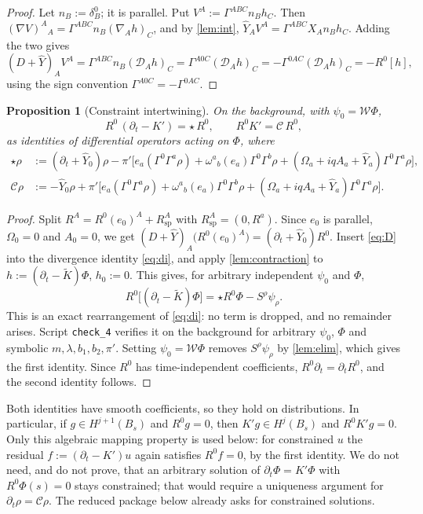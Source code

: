 \documentclass[11pt]{article}
\theoremstyle{plain}
\newtheorem{proposition}[theorem]{Proposition}
\theoremstyle{definition}
\theoremstyle{remark}
\newcommand{\Dcal}{\mathcal{D}}
\newcommand{\Wcal}{\mathcal{W}}
\newcommand{\Ccal}{\mathcal{C}}
\begin{document}
\begin{proof}
Let $n_B := \delta^0_B$; it is parallel. Put $V^A := \Gamma^{ABC}n_Bh_C$. Then $(\nabla V)^{A}{}_{A} = \Gamma^{ABC}n_B(\nabla_Ah)_C$, and by \cref{lem:int}, $\hat Y_AV^A = \Gamma^{ABC}X_An_Bh_C$. Adding the two gives
\[
  (D+\hat Y)_AV^A = \Gamma^{ABC}n_B(\Dcal_Ah)_C = \Gamma^{A0C}(\Dcal_Ah)_C = -\Gamma^{0AC}(\Dcal_Ah)_C = -R^0[h],
\]
using the sign convention $\Gamma^{A0C} = -\Gamma^{0AC}$.
\end{proof}

\begin{proposition}[Constraint intertwining]\label{prop:ci}
On the background, with $\psi_0 = \Wcal\Phi$,
\[
  R^0\,(\partial_t - K') = \star\, R^0,\qquad R^0K' = \Ccal\, R^0,
\]
as identities of differential operators acting on $\Phi$, where
\begin{align*}
  \star\rho &:= (\partial_t + \hat Y_0)\rho - \pi'\bigl[e_a(\Gamma^0\Gamma^a\rho) + \omega^{a}{}_{b}(e_a)\Gamma^0\Gamma^b\rho + (\Omega_a + iqA_a + \hat Y_a)\Gamma^0\Gamma^a\rho\bigr],\\
  \Ccal\rho &:= -\hat Y_0\rho + \pi'\bigl[e_a(\Gamma^0\Gamma^a\rho) + \omega^{a}{}_{b}(e_a)\Gamma^0\Gamma^b\rho + (\Omega_a + iqA_a + \hat Y_a)\Gamma^0\Gamma^a\rho\bigr].
\end{align*}
\end{proposition}

\begin{proof}
Split $R^A = R^0(e_0)^A + R^A_{\mathrm{sp}}$ with $R^A_{\mathrm{sp}} = (0,R^a)$. Since $e_0$ is parallel, $\Omega_0 = 0$ and $A_0 = 0$, we get $(D+\hat Y)_A\bigl(R^0(e_0)^A\bigr) = (\partial_t + \hat Y_0)R^0$. Insert \eqref{eq:D} into the divergence identity \eqref{eq:di}, and apply \cref{lem:contraction} to $h := (\partial_t - \tilde K)\Phi$, $h_0 := 0$. This gives, for arbitrary independent $\psi_0$ and $\Phi$,
\[
  R^0\bigl[(\partial_t - \tilde K)\Phi\bigr] = \star R^0\Phi - S^\rho\psi_\rho .
\]
This is an exact rearrangement of \eqref{eq:di}: no term is dropped, and no remainder arises. Script \texttt{check\_4} verifies it on the background for arbitrary $\psi_0$, $\Phi$ and symbolic $m,\lambda,b_1,b_2,\pi'$. Setting $\psi_0 = \Wcal\Phi$ removes $S^\rho\psi_\rho$ by \cref{lem:elim}, which gives the first identity. Since $R^0$ has time-independent coefficients, $R^0\partial_t = \partial_tR^0$, and the second identity follows.
\end{proof}

Both identities have smooth coefficients, so they hold on distributions. In particular, if $g \in H^{j+1}(B_s)$ and $R^0g = 0$, then $K'g \in H^j(B_s)$ and $R^0K'g = 0$. Only this algebraic mapping property is used below: for constrained $u$ the residual $f := (\partial_t - K')u$ again satisfies $R^0f = 0$, by the first identity. We do not need, and do not prove, that an arbitrary solution of $\partial_t\Phi = K'\Phi$ with $R^0\Phi(s) = 0$ stays constrained; that would require a uniqueness argument for $\partial_t\rho = \Ccal\rho$. The reduced package below already asks for constrained solutions.
\end{document}
